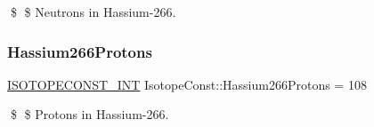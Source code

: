 \$ \$ Neutrons in Hassium-\/266. \mbox{\label{group___isotope_const-_hassium-_hs266_ga57367dc26917c229d6660b47fc2858de}} 
\subsubsection{\texorpdfstring{Hassium266\+Protons}{Hassium266Protons}}
{\footnotesize\ttfamily \mbox{\hyperlink{group___isotope_const-_macros_ga5f18360b3e99483a35c32d789e62621c}{I\+S\+O\+T\+O\+P\+E\+C\+O\+N\+S\+T\+\_\+\+I\+NT}} Isotope\+Const\+::\+Hassium266\+Protons = 108}

\$ \$ Protons in Hassium-\/266. 